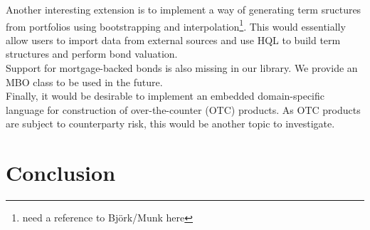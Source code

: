 Another interesting extension is to implement a way of generating term
sructures from portfolios using bootstrapping and interpolation\footnote{need
a reference to Björk/Munk here}. This would essentially allow users to import
data from external sources and use HQL to build term structures and perform
bond valuation.\\

Support for mortgage-backed bonds is also missing in our library. We provide
an MBO class to be used in the future.\\


Finally, it would be desirable to implement an embedded domain-specific language
for construction of over-the-counter (OTC) products.
As OTC products are subject to counterparty risk, this would be another topic
to investigate.


\chapter{Conclusion}
